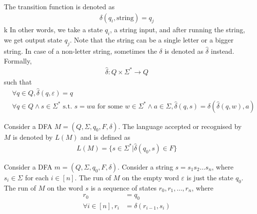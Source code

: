 \documentclass[a4paper]{article}
\theoremstyle{plain}
\theoremstyle{definition}
\newtheorem{defn}{Definition}[section]
\theoremstyle{remark}
\begin{document}
\begin{tcolorbox}[colback=black!3!white,colframe=black!60!white,title=\begin{defn}Transition Function \label{Transition Function}\end{defn}]
The transition function is denoted as
\begin{align}
\delta(q_i,\text{string}) = q_j
\end{align}k
In other words, we take a state $q_i$, a string input, and after running the string, we get output state $q_j$. Note that the string can be a single letter or a bigger string. In case of a non-letter string, sometimes the $\delta$ is denoted as $\hat{\delta}$ instead. Formally,
\begin{align}
	\hat{\delta}:Q\times \Sigma^{*} \to Q	
\end{align}
such that
\begin{align}
	&\forall q \in Q, \hat{\delta}(q,\varepsilon) = q \\
	&\forall q \in Q \land s \in \Sigma^{*} \text{ s.t. } s = wa \text{ for some } w \in \Sigma^{*} \land a \in \Sigma, \hat{\delta}(q,s) = \delta(\hat{\delta}(q,w),a)
\end{align}
\end{tcolorbox}
\begin{tcolorbox}[colback=black!3!white,colframe=black!60!white,title=\begin{defn}Language accepted by DFA \label{Language accepted by DFA}\end{defn}]
Consider a DFA $M = (Q,\Sigma,q_0,F,\delta)$. The language accepted or recognised by $M$ is denoted by $L(M)$ and is defined as
\begin{align}
L(M) = \{ s \in \Sigma^{*} | \hat{\delta}(q_0,s) \in F \}
\end{align}
\end{tcolorbox}
\begin{tcolorbox}[colback=black!3!white,colframe=black!60!white,title=\begin{defn}Run of a DFA \label{Run of a DFA}\end{defn}]
Consider a DFA  $m = (Q,\Sigma,q_0,F,\delta).$ Consider a string $s=s_1s_2\ldots s_n$, where $s_i \in \Sigma$ for each $i \in [n]$. The run of $M$ on the empty word $\varepsilon$ is just the state $q_0$. The run of $M$ on the word $s$ is a sequence of states $r_0,r_1,\ldots,r_n$, where
\begin{align}
	r_0&=q_0 \\
\forall i \in [n],r_i &= \delta(r_{i-1},s_i)
\end{align}
\end{tcolorbox}
\end{document}
